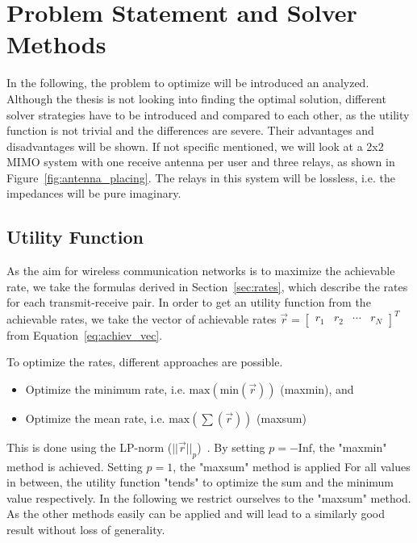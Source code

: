 \chapter{Problem Statement and Solver Methods}
\label{sec:solver}

In the following, the problem to optimize will be introduced an analyzed.
Although the thesis is not looking into finding the optimal solution, different solver strategies have to be introduced and compared to each other, as the utility function is not trivial and the differences are severe.
Their advantages and disadvantages will be shown.
If not specific mentioned, we will look at a 2x2 MIMO system with one receive antenna per user and three relays, as shown in Figure~\ref{fig:antenna_placing}.
The relays in this system will be lossless, i.e. the impedances will be pure imaginary.

\section{Utility Function}
\label{sec:utility_function}
As the aim for wireless communication networks is to maximize the achievable rate, we take the formulas derived in Section~\ref{sec:rates}, which describe the rates for each transmit-receive pair.
In order to get an utility function from the achievable rates, we take the vector of achievable rates $\vec{r} = \begin{bmatrix}
r_1 & r_2 & \cdots & r_N
\end{bmatrix}^T$ from Equation~\eqref{eq:achiev_vec}.

To optimize the rates, different approaches are possible.
\begin{itemize}
\item Optimize the minimum rate, i.e. $\text{max}\left(\text{min}(\vec{r})\right)$ (maxmin), and
\item Optimize the mean rate, i.e. $\text{max}\left(\sum(\vec{r})\right)$ (maxsum)
\end{itemize}

This is done using the LP-norm ($||\vec{r}||_p$)~\cite[p.853]{Kreyszig}.
By setting $p = -\text{Inf}$, the "maxmin" method is achieved.
Setting $p = 1$, the "maxsum" method is applied
For all values in between, the utility function "tends" to optimize the sum and the minimum value respectively.
In the following we restrict ourselves to the "maxsum" method.
As the other methods easily can be applied and will lead to a similarly good result without loss of generality.


